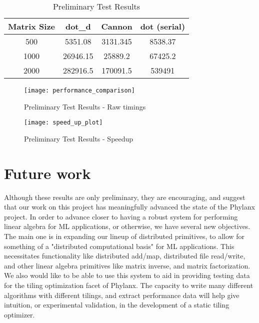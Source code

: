 \begin{table}
	\centering
	\begin{tabular}{|c|c|c|c|} 
		\hline
		Matrix Size & dot\_d & Cannon & dot (serial) \\ [0.5ex] 
		\hline
		500 & 5351.08 & 3131.345 & 8538.37 \\ 
		\hline
		1000 & 26946.15 & 25889.2 & 67425.2 \\
		\hline
		2000 & 282916.5 & 170091.5 & 539491 \\ [1ex]
		\hline
	\end{tabular}
	\caption{Preliminary Test Results}
	\label{table_1}
\end{table}

\begin{figure}
	\centering
	\texttt{[image: performance\_comparison]}
	\caption{Preliminary Test Results - Raw timings}
	\label{Fig_10}
\end{figure}

\begin{figure}
	\centering
	\texttt{[image: speed\_up\_plot]}
	\caption{Preliminary Test Results - Speedup}
	\label{Fig_11}
\end{figure}

\section{Future work}
Although these results are only preliminary, they are encouraging, and suggest that our work on this project has meaningfully advanced the state of the Phylanx project. In order to advance closer to having a robust system for performing linear algebra for ML applications, or otherwise, we have several new objectives. The main one is in expanding our lineup of distributed primitives, to allow for something of a "distributed computational basis" for ML applications. This necessitates functionality like distributed add/map, distributed file read/write, and other linear algebra primitives like matrix inverse, and matrix factorization. We also would like to be able to use this system to aid in providing testing data for the tiling optimization facet of Phylanx. The capacity to write many different algorithms with different tilings, and extract performance data will help give intuition, or experimental validation, in the development of a static tiling optimizer.
	



%
